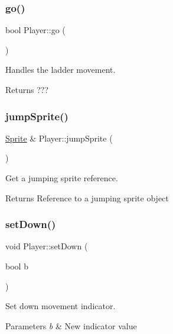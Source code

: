 \subsubsection{\texorpdfstring{go()}{go()}}
{\footnotesize\ttfamily bool Player\+::go (\begin{DoxyParamCaption}{ }\end{DoxyParamCaption})}



Handles the ladder movement. 

\begin{DoxyReturn}{Returns}
??? 
\end{DoxyReturn}
\mbox{\label{class_player_a8dd19a1c1f7d541853bb4d676f9f1014}} 
\subsubsection{\texorpdfstring{jump\+Sprite()}{jumpSprite()}}
{\footnotesize\ttfamily \hyperlink{class_sprite}{Sprite} \& Player\+::jump\+Sprite (\begin{DoxyParamCaption}{ }\end{DoxyParamCaption})}



Get a jumping sprite reference. 

\begin{DoxyReturn}{Returns}
Reference to a jumping sprite object 
\end{DoxyReturn}
\mbox{\label{class_player_a9a5e1acdaf939df0cde9b54d6a88e79d}} 
\subsubsection{\texorpdfstring{set\+Down()}{setDown()}}
{\footnotesize\ttfamily void Player\+::set\+Down (\begin{DoxyParamCaption}\item[{bool}]{b }\end{DoxyParamCaption})}



Set down movement indicator. 


\begin{DoxyParams}{Parameters}
{\em b} & New indicator value \\
\hline
\end{DoxyParams}
\mbox{\label{class_player_a5add9f5bf703663538a25234bdd93291}} 
